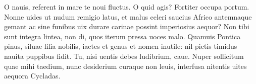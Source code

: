 \documentclass{book}
\newenvironment {carmen} [1] [\relax] 
  {\Titulus \Versus \incipit*\numerus{1}#1}
  {\endVersus}
\newcommand {\AsclB}     {\Forma \strophae {0 \poena 02 \poena 3}}
\begin{document}
\begin{carmen}[\AsclB]
O nauis, referent in mare te noui
 fluctus. O quid agis? Fortiter occupa
      portum. Nonne uides ut
      nudum remigio latus,
 et malus celeri saucius Africo               
 antemnaque gemant ac sine funibus
      uix durare carinae
      possint imperiosius
 aequor? Non tibi sunt integra lintea,
 non di, quos iterum pressa uoces malo.               
      Quamuis Pontica pinus,
      siluae filia nobilis,
 iactes et genus et nomen inutile:
 nil pictis timidus nauita puppibus
       fidit. Tu, nisi uentis               
      debes ludibrium, caue.
 Nuper sollicitum quae mihi taedium,
 nunc desiderium curaque non leuis,
      interfusa nitentis
       uites aequora Cycladas.                

\end{carmen}
\end{document}
